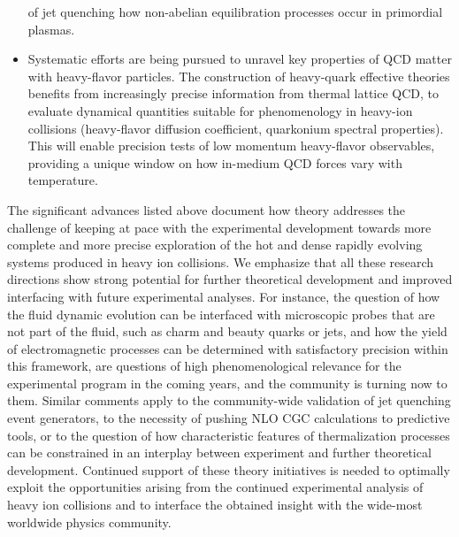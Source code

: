 \begin{itemize}
of jet quenching how non-abelian equilibration processes occur in primordial plasmas. 
\item Systematic efforts are being pursued to unravel key properties of QCD matter with heavy-flavor particles. The 
construction of heavy-quark effective theories benefits from increasingly precise information from thermal lattice QCD, to 
evaluate dynamical quantities suitable for phenomenology in heavy-ion collisions (heavy-flavor diffusion coefficient, 
quarkonium spectral properties). This will enable precision tests of low momentum heavy-flavor observables, providing a 
unique window on how in-medium QCD forces vary with temperature.
\end{itemize}

The significant advances listed above document how theory addresses the challenge of keeping at pace with the
experimental development towards more complete and more precise exploration of the hot and dense rapidly 
evolving systems produced in heavy ion collisions. We emphasize that all these research directions show strong 
potential for further theoretical development and improved interfacing with future experimental analyses.
 For instance, the question of how the fluid dynamic evolution can be
interfaced with microscopic probes that are not part of the fluid, such as charm and beauty quarks or jets, and
how the yield of electromagnetic processes can be determined with satisfactory precision within this framework, 
are questions of high phenomenological relevance for the experimental program in the coming years, and
the community is turning now to them. Similar comments apply to the community-wide validation of jet quenching 
event generators, to the necessity of pushing NLO CGC calculations to predictive tools, or to the question of how
characteristic features of thermalization processes can be constrained in an interplay between experiment and
further theoretical development. Continued support of these theory initiatives is needed to optimally exploit the
opportunities arising from the continued experimental analysis of heavy ion collisions and to interface the
obtained insight with the wide-most worldwide physics community. 
